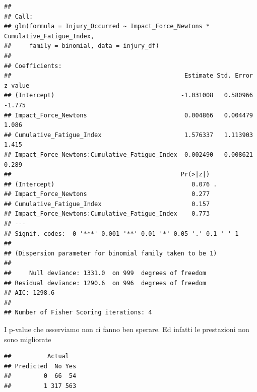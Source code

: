 \documentclass[
]{article}
\newenvironment{Shaded}{\begin{snugshade}}{\end{snugshade}}
\newcommand{\AttributeTok}[1]{\textcolor[rgb]{0.13,0.29,0.53}{#1}}
\newcommand{\DecValTok}[1]{\textcolor[rgb]{0.00,0.00,0.81}{#1}}
\newcommand{\FloatTok}[1]{\textcolor[rgb]{0.00,0.00,0.81}{#1}}
\newcommand{\FunctionTok}[1]{\textcolor[rgb]{0.13,0.29,0.53}{\textbf{#1}}}
\newcommand{\NormalTok}[1]{#1}
\newcommand{\OtherTok}[1]{\textcolor[rgb]{0.56,0.35,0.01}{#1}}
\newcommand{\SpecialCharTok}[1]{\textcolor[rgb]{0.81,0.36,0.00}{\textbf{#1}}}
\newcommand{\StringTok}[1]{\textcolor[rgb]{0.31,0.60,0.02}{#1}}
\begin{document}
\begin{verbatim}
## 
## Call:
## glm(formula = Injury_Occurred ~ Impact_Force_Newtons * Cumulative_Fatigue_Index, 
##     family = binomial, data = injury_df)
## 
## Coefficients:
##                                                Estimate Std. Error z value
## (Intercept)                                   -1.031008   0.580966  -1.775
## Impact_Force_Newtons                           0.004866   0.004479   1.086
## Cumulative_Fatigue_Index                       1.576337   1.113903   1.415
## Impact_Force_Newtons:Cumulative_Fatigue_Index  0.002490   0.008621   0.289
##                                               Pr(>|z|)  
## (Intercept)                                      0.076 .
## Impact_Force_Newtons                             0.277  
## Cumulative_Fatigue_Index                         0.157  
## Impact_Force_Newtons:Cumulative_Fatigue_Index    0.773  
## ---
## Signif. codes:  0 '***' 0.001 '**' 0.01 '*' 0.05 '.' 0.1 ' ' 1
## 
## (Dispersion parameter for binomial family taken to be 1)
## 
##     Null deviance: 1331.0  on 999  degrees of freedom
## Residual deviance: 1290.6  on 996  degrees of freedom
## AIC: 1298.6
## 
## Number of Fisher Scoring iterations: 4
\end{verbatim}

I p-value che osserviamo non ci fanno ben sperare. Ed infatti le
prestazioni non sono migliorate

\begin{Shaded}
\end{Shaded}

\begin{verbatim}
##          Actual
## Predicted  No Yes
##         0  66  54
##         1 317 563
\end{verbatim}
\end{document}
